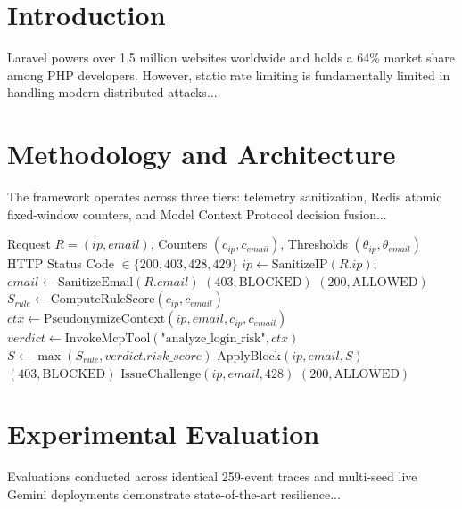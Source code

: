 \documentclass[smallextended]{svjour3}
\begin{document}
\section{Introduction}
Laravel powers over 1.5 million websites worldwide and holds a 64\% market share among PHP developers. However, static rate limiting is fundamentally limited in handling modern distributed attacks...

\section{Methodology and Architecture}
The framework operates across three tiers: telemetry sanitization, Redis atomic fixed-window counters, and Model Context Protocol decision fusion...

\begin{algorithm}[H]
\caption{HySA-MCP Hybrid Request Classification and Enforcement}
\begin{algorithmic}[1]
\Require Request $R = (ip, email)$, Counters $(c_{ip}, c_{email})$, Thresholds $(\theta_{ip}, \theta_{email})$
\Ensure HTTP Status Code $\in \{200, 403, 428, 429\}$
\State $ip \gets \text{SanitizeIP}(R.ip)$; $email \gets \text{SanitizeEmail}(R.email)$
    \State \Return $(403, \text{BLOCKED})$ 
\EndIf
{}
    \State \Return $(200, \text{ALLOWED})$ 
\EndIf
\State $S_{rule} \gets \text{ComputeRuleScore}(c_{ip}, c_{email})$
\State $ctx \gets \text{PseudonymizeContext}(ip, email, c_{ip}, c_{email})$
\State $verdict \gets \text{InvokeMcpTool}(\text{"analyze\_login\_risk"}, ctx)$
\State $S \gets \max(S_{rule}, verdict.risk\_score)$ 
    \State $\text{ApplyBlock}(ip, email, S)$
    \State \Return $(403, \text{BLOCKED})$
    \State \Return $\text{IssueChallenge}(ip, email, 428)$ 
\Else
    \State \Return $(200, \text{ALLOWED})$
\EndIf
\end{algorithmic}
\end{algorithm}

\section{Experimental Evaluation}
Evaluations conducted across identical 259-event traces and multi-seed live Gemini deployments demonstrate state-of-the-art resilience...
\end{document}
